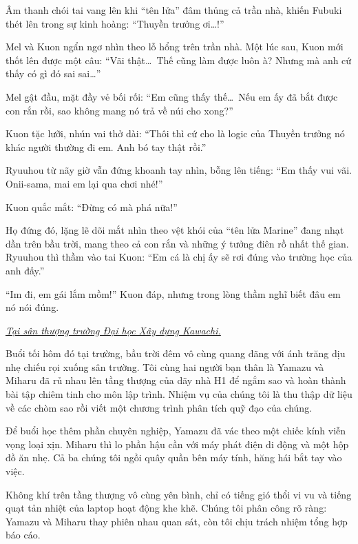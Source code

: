 \documentclass[../main.tex]{subfiles}
\begin{document}
Âm thanh chói tai vang lên khi ``tên lửa'' đâm thủng cả trần nhà, khiến Fubuki thét lên trong sự kinh hoàng: ``Thuyền trưởng ơi\dots!''

Mel và Kuon ngẩn ngơ nhìn theo lỗ hổng trên trần nhà. Một lúc sau, Kuon mới thốt lên được một câu: ``Vãi thật\dots\ Thế cũng làm được luôn à? Nhưng mà anh cứ thấy có gì đó sai sai\dots''

Mel gật đầu, mặt đầy vẻ bối rối: ``Em cũng thấy thế\dots\ Nếu em ấy đã bắt được con rắn rồi, sao không mang nó trả về núi cho xong?''

Kuon tặc lưỡi, nhún vai thở dài: ``Thôi thì cứ cho là logic của Thuyền trưởng nó khác người thường đi em. Anh bó tay thật rồi.''

Ryuuhou từ nãy giờ vẫn đứng khoanh tay nhìn, bỗng lên tiếng: ``Em thấy vui vãi. Onii-sama, mai em lại qua chơi nhé!''

Kuon quắc mắt: ``Đừng có mà phá nữa!''

Họ đứng đó, lặng lẽ dõi mắt nhìn theo vệt khói của ``tên lửa Marine'' đang nhạt dần trên bầu trời, mang theo cả con rắn và những ý tưởng điên rồ nhất thế gian. Ryuuhou thì thầm vào tai Kuon: ``Em cá là chị ấy sẽ rơi đúng vào trường học của anh đấy.''

``Im đi, em gái lắm mồm!'' Kuon đáp, nhưng trong lòng thầm nghĩ biết đâu em nó nói đúng.

\omk

\begin{center}
  \textit{\uline{Tại sân thượng trường Đại học Xây dựng Kawachi.}}
\end{center}

Buổi tối hôm đó tại trường, bầu trời đêm vô cùng quang đãng với ánh trăng dịu nhẹ chiếu rọi xuống sân trường. Tôi cùng hai người bạn thân là Yamazu và Miharu đã rủ nhau lên tầng thượng của dãy nhà H1 để ngắm sao và hoàn thành bài tập chiêm tinh cho môn lập trình. Nhiệm vụ của chúng tôi là thu thập dữ liệu về các chòm sao rồi viết một chương trình phân tích quỹ đạo của chúng.

Để buổi học thêm phần chuyên nghiệp, Yamazu đã vác theo một chiếc kính viễn vọng loại xịn. Miharu thì lo phần hậu cần với máy phát điện di động và một hộp đồ ăn nhẹ. Cả ba chúng tôi ngồi quây quần bên máy tính, hăng hái bắt tay vào việc.

Không khí trên tầng thượng vô cùng yên bình, chỉ có tiếng gió thổi vi vu và tiếng quạt tản nhiệt của laptop hoạt động khe khẽ. Chúng tôi phân công rõ ràng: Yamazu và Miharu thay phiên nhau quan sát, còn tôi chịu trách nhiệm tổng hợp báo cáo.
\end{document}
